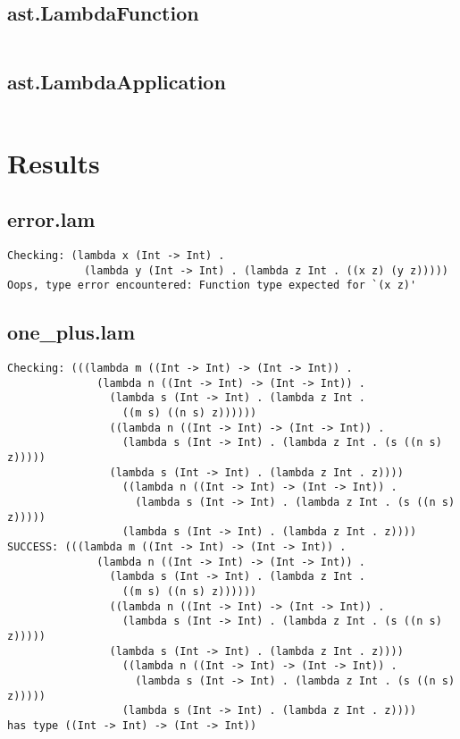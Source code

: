 \documentclass[11pt, numbers=endperiod, parskip=half]{scrartcl}
\begin{document}
\subsection{ast.LambdaFunction}
\inputminted[tabsize=2]{java}{LambdaTypeSystem/src/ast/LambdaFunction.java}

\subsection{ast.LambdaApplication}
\inputminted[tabsize=2]{java}{LambdaTypeSystem/src/ast/LambdaApplication.java}

\restoregeometry
\section{Results}
\subsection{error.lam}
\begin{verbatim}
Checking: (lambda x (Int -> Int) .
            (lambda y (Int -> Int) . (lambda z Int . ((x z) (y z)))))
Oops, type error encountered: Function type expected for `(x z)'
\end{verbatim}
\subsection{one\_plus.lam}
\begin{verbatim}
Checking: (((lambda m ((Int -> Int) -> (Int -> Int)) .
              (lambda n ((Int -> Int) -> (Int -> Int)) .
                (lambda s (Int -> Int) . (lambda z Int .
                  ((m s) ((n s) z))))))
                ((lambda n ((Int -> Int) -> (Int -> Int)) .
                  (lambda s (Int -> Int) . (lambda z Int . (s ((n s) z)))))
                (lambda s (Int -> Int) . (lambda z Int . z))))
                  ((lambda n ((Int -> Int) -> (Int -> Int)) .
                    (lambda s (Int -> Int) . (lambda z Int . (s ((n s) z)))))
                  (lambda s (Int -> Int) . (lambda z Int . z))))
SUCCESS: (((lambda m ((Int -> Int) -> (Int -> Int)) .
              (lambda n ((Int -> Int) -> (Int -> Int)) .
                (lambda s (Int -> Int) . (lambda z Int .
                  ((m s) ((n s) z))))))
                ((lambda n ((Int -> Int) -> (Int -> Int)) .
                  (lambda s (Int -> Int) . (lambda z Int . (s ((n s) z)))))
                (lambda s (Int -> Int) . (lambda z Int . z))))
                  ((lambda n ((Int -> Int) -> (Int -> Int)) .
                    (lambda s (Int -> Int) . (lambda z Int . (s ((n s) z)))))
                  (lambda s (Int -> Int) . (lambda z Int . z))))
has type ((Int -> Int) -> (Int -> Int))
\end{verbatim}
\end{document}
